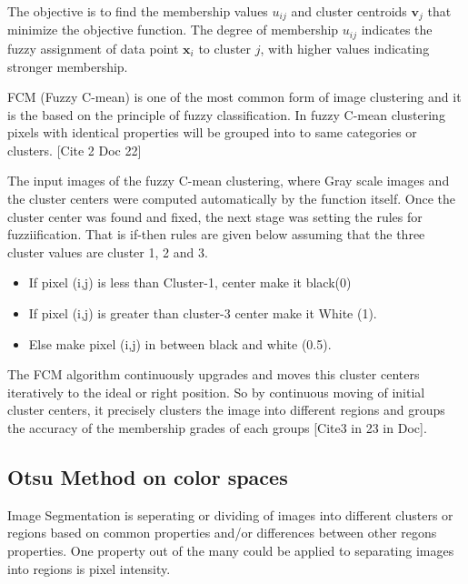 \documentclass[12pt,a4paper,IEEEtran]{article}
\begin{document}
The objective is to find the membership values \( u_{ij} \) and cluster centroids \( \mathbf{v}_j \) that minimize the objective function. The degree of membership \( u_{ij} \) indicates the fuzzy assignment of data point \( \mathbf{x}_i \) to cluster \( j \), with higher values indicating stronger membership.


FCM (Fuzzy C-mean) is one of the most common form of image clustering and it is the based on the principle of fuzzy classification. In fuzzy C-mean clustering pixels with identical properties will be grouped into to same categories or clusters. [Cite 2 Doc 22]

The input images of the fuzzy C-mean clustering, where Gray scale images and the cluster centers were computed automatically by the function itself. Once the cluster center was found and fixed, the next stage was setting the rules for fuzziification. That is if-then rules are given below assuming that the three cluster values are cluster 1, 2 and 3.
\begin{itemize}
	
	\item If pixel (i,j) is less than Cluster-1, center make it black(0)
	\item If pixel (i,j) is greater than cluster-3 center make it White (1).
	\item Else make pixel (i,j) in between black and white (0.5). 	
\end{itemize}

The FCM algorithm continuously upgrades and moves this cluster centers iteratively to the ideal or right position. So by continuous moving of initial cluster centers, it precisely clusters the image into different regions and groups the accuracy of the membership grades of each groups [Cite3 in 23 in Doc]. 


\subsection[3.2]{Otsu Method on color spaces}
Image Segmentation is seperating or dividing of images into different clusters or regions based on common properties and/or differences between other regons properties. One property out of the many could be applied to separating images into regions is pixel intensity. 
\end{document}
